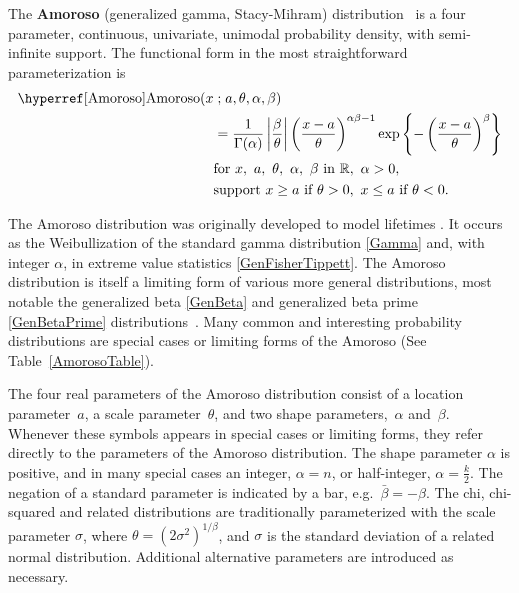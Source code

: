 

\label{sec:Amoroso}
The {\bf Amoroso}  (generalized gamma, Stacy-Mihram) distribution~\cite{Amoroso1925,Johnson1994,Gonzalez2013} is a four parameter,  continuous, univariate, unimodal probability density, with semi-infinite support. The functional form in the most straightforward parameterization is
\begin{align}
\label{Amoroso}  
 \opr{Amoroso}(x&\given  a, \theta, \alpha, \beta) 
\\ \notag&=
\frac{1}{\Gamma(\alpha)} 
\left|\frac{\beta}{\theta}\right|
\left(\frac{x-a}{\theta}\right)^{\alpha \beta -1}
\exp \left\{
-  \left(\frac{x-a}{\theta}\right)^{\beta}
\right\}
\checked
\\ \notag
& \text{for } x,\ a,\ \theta,\ \alpha,\ \beta\  \text{in } \mathbb{R}, 
\ \alpha>0, \ 
\\ \notag
& \text{support } x \geq a \ \text{if}\ \theta > 0,  \ x\leq a  \ \text{if}\  \theta < 0 .
\end{align}

The Amoroso distribution was originally developed to model lifetimes \cite{Amoroso1925}. It occurs as the Weibullization of the standard gamma distribution \eqref{Gamma} and, with integer $\alpha$, in extreme value statistics \eqref{GenFisherTippett}. The Amoroso distribution is itself a limiting form of various more general distributions, most notable the generalized beta \eqref{GenBeta} and generalized beta prime \eqref{GenBetaPrime} distributions~\cite{McDonald1984}.
Many common and interesting probability distributions are special cases or limiting forms of the Amoroso  (See Table~\ref{AmorosoTable}). 


The four real parameters of the Amoroso distribution consist of a location parameter~$a$, 
a scale parameter~$\theta$,  and two shape parameters,~$\alpha$ and~$\beta$. Whenever these symbols appears in special cases or limiting forms, they refer directly to the parameters of the Amoroso distribution.
The shape parameter $\alpha$ is positive, and in many special cases an integer, $\alpha=n$, or half-integer, $\alpha=\tfrac{k}{2}$. The negation of a standard parameter is indicated by a bar, e.g.\ $\bar{\beta} = -\beta$. The chi, chi-squared and related distributions are traditionally parameterized with the scale parameter $\sigma$, where $\theta= (2\sigma^2)^{1/{\beta}}$, and $\sigma$ is the standard deviation of a related normal distribution.  Additional alternative parameters are introduced as necessary. 
  


